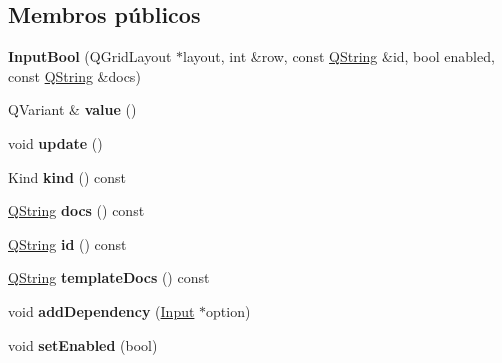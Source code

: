 \subsection*{Membros públicos}
\begin{DoxyCompactItemize}
\item 
\hypertarget{class_input_bool_ac4b706a3c11d9ae06a181620f39630aa}{{\bfseries Input\-Bool} (Q\-Grid\-Layout $\ast$layout, int \&row, const \hyperlink{class_q_string}{Q\-String} \&id, bool enabled, const \hyperlink{class_q_string}{Q\-String} \&docs)}\label{class_input_bool_ac4b706a3c11d9ae06a181620f39630aa}

\item 
\hypertarget{class_input_bool_a5dd524f67ae7ed0efa64313fe71e4605}{Q\-Variant \& {\bfseries value} ()}\label{class_input_bool_a5dd524f67ae7ed0efa64313fe71e4605}

\item 
\hypertarget{class_input_bool_ac5c54df7ed3b930268c8d7752c101725}{void {\bfseries update} ()}\label{class_input_bool_ac5c54df7ed3b930268c8d7752c101725}

\item 
\hypertarget{class_input_bool_aa9d037bed9f9a083d0cd01485637d843}{Kind {\bfseries kind} () const }\label{class_input_bool_aa9d037bed9f9a083d0cd01485637d843}

\item 
\hypertarget{class_input_bool_ab817379a6af112723841e17901826ec2}{\hyperlink{class_q_string}{Q\-String} {\bfseries docs} () const }\label{class_input_bool_ab817379a6af112723841e17901826ec2}

\item 
\hypertarget{class_input_bool_a06be2d738a4fe9fdb941cb24161b26c0}{\hyperlink{class_q_string}{Q\-String} {\bfseries id} () const }\label{class_input_bool_a06be2d738a4fe9fdb941cb24161b26c0}

\item 
\hypertarget{class_input_bool_a76f4a83c9cf30eb78d2b5f276cf649de}{\hyperlink{class_q_string}{Q\-String} {\bfseries template\-Docs} () const }\label{class_input_bool_a76f4a83c9cf30eb78d2b5f276cf649de}

\item 
\hypertarget{class_input_bool_a310c9519b5a7b38a6c504e2827d5eae5}{void {\bfseries add\-Dependency} (\hyperlink{class_input}{Input} $\ast$option)}\label{class_input_bool_a310c9519b5a7b38a6c504e2827d5eae5}

\item 
\hypertarget{class_input_bool_ac34148588ffb4fc781ecfff97baa742c}{void {\bfseries set\-Enabled} (bool)}\label{class_input_bool_ac34148588ffb4fc781ecfff97baa742c}


\end{DoxyCompactItemize}
